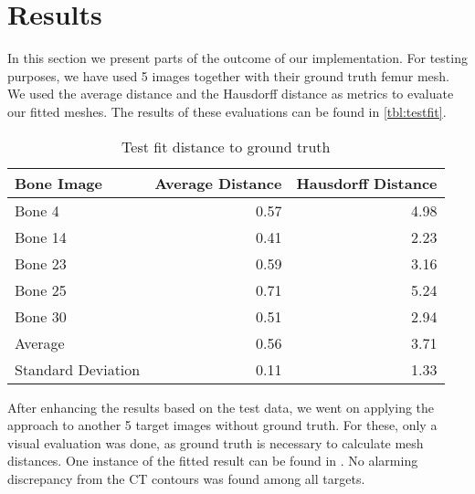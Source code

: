 \section{Results}
\label{sec:results}

In this section we present parts of the outcome of our implementation.
For testing purposes, we have used 5 images together with their ground truth femur mesh.
We used the average distance and the Hausdorff distance as metrics to evaluate our fitted meshes.
The results of these evaluations can be found in \autoref{tbl:testfit}.

\begin{table}
  \centering
  \caption{Test fit distance to ground truth}
  \label{tbl:testfit}
  \begin{tabular}{lrr}
    \toprule
      \textbf{Bone Image} &
      Average Distance &
       Hausdorff Distance \\
    \midrule
      Bone 4 & 0.57 & 4.98 \\
      Bone 14 & 0.41 & 2.23 \\
      Bone 23 & 0.59 & 3.16 \\
      Bone 25 & 0.71 & 5.24 \\
      Bone 30 & 0.51 & 2.94 \\
    \midrule
      Average & 0.56 & 3.71 \\
      Standard Deviation & 0.11 & 1.33 \\
    \bottomrule
  \end{tabular}
\end{table}

After enhancing the results based on the test data, we went on applying the approach to another 5 target images without ground truth.
For these, only a visual evaluation was done, as ground truth is necessary to calculate mesh distances.
One instance of the fitted result can be found in .
No alarming discrepancy from the CT contours was found among all targets.
